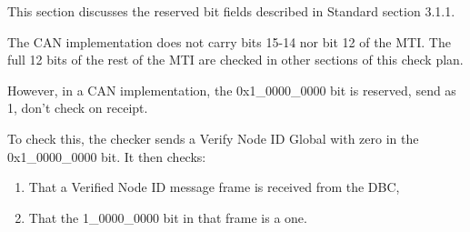 This section discusses the reserved bit fields described in Standard section 3.1.1.

The CAN implementation does not carry bits 15-14 nor bit 12 of the MTI. 
The full 12 bits of the rest of the MTI are checked in other sections of this check plan.

However, in a CAN implementation, the 0x1\_0000\_0000 bit is reserved, send as 1, 
don't check on receipt.

To check this, the checker sends a Verify Node ID Global with zero in the 0x1\_0000\_0000
bit. It then checks:

\begin{enumerate}
\item That a Verified Node ID message frame is received from the DBC,
\item That the 1\_0000\_0000 bit in that frame is a one.
\end{enumerate}



  
